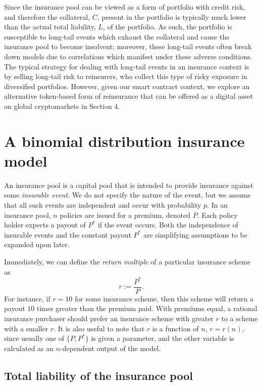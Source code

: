 \documentclass[12pt]{article}
\begin{document}
Since the insurance pool can be viewed as a form of portfolio with credit risk, and therefore the collateral, $C$, present in the portfolio is typically much lower than the actual total liability, $L$, of the portfolio. As such, the portfolio is susceptible to long-tail events which exhaust the collateral and cause the insurance pool to become insolvent; moreover, these long-tail events often break down models due to correlations which manifest under these adverse conditions. The typical strategy for dealing with long-tail events in an insurance context is by selling long-tail risk to reinsurers, who collect this type of risky exposure in diversified portfolios. However, given our smart contract context, we explore an alternative token-based form of reinsurance that can be offered as a digital asset on global cryptomarkets in Section 4.

\section{A binomial distribution insurance model}

An insurance pool is a capital pool that is intended to provide insurance against some \textit{insurable event}. We do not specify the nature of the event, but we assume that all such events are independent and occur with probability $p$. In an insurance pool, $n$ policies are issued for a premium, denoted $P$.  Each policy holder expects a payout of $P^*$ if the event occurs. Both the independence of insurable events and the constant payout $P^*$ are simplifying assumptions to be expanded upon later.

Immediately, we can define the \textit{return multiple} of a particular insurance scheme as
\begin{equation}
  \label{return}
  r := \frac{P^*}{P}.
\end{equation}
For instance, if $r = 10$ for some insurance scheme, then this scheme will return a payout $10$ times greater than the premium paid. With premiums equal, a rational insurance purchaser should prefer an insurance scheme with greater $r$ to a scheme with a smaller $r$. It is also useful to note that $r$ is a function of $n$, $r=r(n)$, since usually one of $\{P, P^*\}$ is given a parameter, and the other variable is calculated as an $n$-dependent output of the model.

\subsection{Total liability of the insurance pool}
\end{document}
